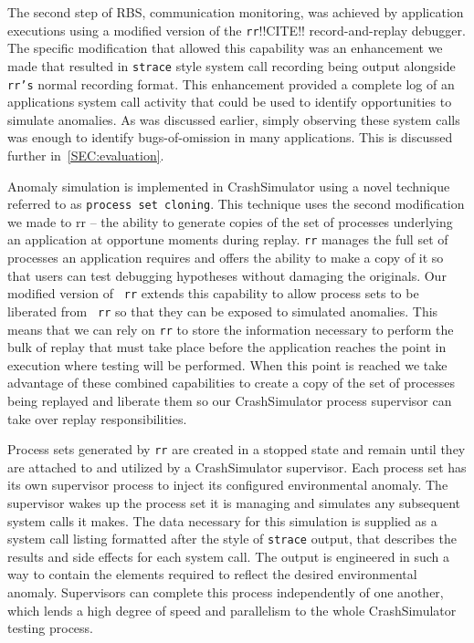 The second step of RBS, communication monitoring, was achieved by
application executions using a modified version of the {\tt rr}!!CITE!!
record-and-replay debugger.  The specific modification that allowed this
capability was an enhancement we made that resulted in {\tt strace} style
system call recording being output alongside {\tt rr's} normal recording
format.
This enhancement provided
a complete log of an applications system call activity
that could be used to identify opportunities to simulate anomalies.  As was
discussed earlier, simply observing these system calls was enough to
identify bugs-of-omission in many applications.  This is discussed further
in~\ref{SEC:evaluation}.

Anomaly simulation is implemented in CrashSimulator using a novel technique
referred to as {\tt process set cloning}.  This technique uses the second
modification we made to rr -- the ability to generate copies of the set of
processes underlying an application at opportune moments during replay.
{\tt rr} manages
the full set of processes an application requires and offers the ability to
make a copy of it so that users can test debugging
hypotheses without damaging the originals.  Our modified version of {\tt
rr} extends this capability to allow process sets to be liberated from {\tt
rr} so that they can be exposed to simulated anomalies.
This means that we can rely on {\tt rr}
to store the information necessary to perform the bulk of
replay that must take place before the application reaches the point in
execution where testing will be performed.  When this point is reached we
take advantage of these combined capabilities
to create a
copy of the set of processes being replayed and liberate them so our
CrashSimulator process supervisor can take over replay responsibilities.

Process sets generated by {\tt rr} are created in a stopped state and
remain until they are attached to and utilized by a CrashSimulator
supervisor.  Each process set has its own supervisor process to inject
its configured environmental anomaly.  The
supervisor wakes up the process set it is managing and simulates any
subsequent system calls it makes.  The data necessary for this
simulation is
supplied as a system call listing formatted after the style of {\tt strace}
output, that describes the results and side effects for each system
call. The output is engineered in such a way to contain the
elements required to reflect the
desired environmental anomaly.  Supervisors can complete this
process independently of one another, which lends a
high degree of speed and
parallelism to the whole CrashSimulator testing process.


